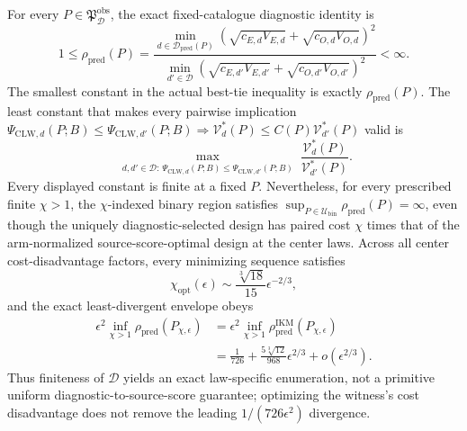 For every \(P\in\mathfrak P_{\mathcal D}^{\mathrm{obs}}\), the exact fixed-catalogue diagnostic identity is
\[
 1\le\rho_{\mathrm{pred}}(P)
 =\frac{\min_{d\in\mathcal D_{\mathrm{pred}}(P)}
 (\sqrt{c_{E,d}V_{E,d}}+\sqrt{c_{O,d}V_{O,d}})^2}
 {\min_{d'\in\mathcal D}
 (\sqrt{c_{E,d'}V_{E,d'}}+\sqrt{c_{O,d'}V_{O,d'}})^2}<\infty.
\]
The smallest constant in the actual best-tie inequality is exactly \(\rho_{\mathrm{pred}}(P)\). The least constant that makes every pairwise implication
\(\Psi_{\mathrm{CLW},d}(P;B)\le\Psi_{\mathrm{CLW},d'}(P;B)\Rightarrow \mathcal V_d^*(P)\le C(P)\mathcal V_{d'}^*(P)\)
valid is
\[
 \max_{\substack{d,d'\in\mathcal D:\,
 \Psi_{\mathrm{CLW},d}(P;B)\le\Psi_{\mathrm{CLW},d'}(P;B)}}
 \frac{\mathcal V_d^*(P)}{\mathcal V_{d'}^*(P)}.
\]
Every displayed constant is finite at a fixed \(P\). Nevertheless, for every prescribed finite \(\chi>1\), the \(\chi\)-indexed binary region satisfies \(\sup_{P\in\mathcal U_{\mathrm{bin}}}\rho_{\mathrm{pred}}(P)=\infty\), even though the uniquely diagnostic-selected design has paired cost \(\chi\) times that of the arm-normalized source-score-optimal design at the center laws. Across all center cost-disadvantage factors, every minimizing sequence satisfies
\[
 \chi_{\mathrm{opt}}(\epsilon)
 \sim\frac{\sqrt[3]{18}}{15}\epsilon^{-2/3},
\]
and the exact least-divergent envelope obeys
\[
\begin{aligned}
 \epsilon^2\inf_{\chi>1}\rho_{\mathrm{pred}}(P_{\chi,\epsilon})
 &=\epsilon^2\inf_{\chi>1}\rho_{\mathrm{pred}}^{\mathrm{IKM}}(P_{\chi,\epsilon})\\
 &=\frac1{726}+\frac{5\sqrt[3]{12}}{968}\epsilon^{2/3}
 +o(\epsilon^{2/3}).
\end{aligned}
\]
Thus finiteness of \(\mathcal D\) yields an exact law-specific enumeration, not a primitive uniform diagnostic-to-source-score guarantee; optimizing the witness's cost disadvantage does not remove the leading \(1/(726\epsilon^2)\) divergence.